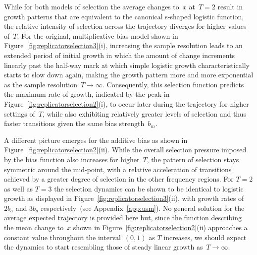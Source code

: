 While for both models of selection the average changes to~$x$ at~$T=2$ result in growth patterns that are equivalent to the canonical s-shaped logistic function, 
the relative intensity of selection across the trajectory diverges for higher values of~$T$. For the original, multiplicative bias model shown in Figure~\ref{fig:replicatorselection3}(i), increasing the sample resolution leads to an extended period of initial growth in which the amount of change increments linearly past the half-way mark at which simple logistic growth characteristically starts to slow down again, making the growth pattern more and more exponential as the sample resolution~$T\rightarrow\infty$.
Consequently, this selection function predicts the maximum rate of growth, indicated by the peak in Figure~\ref{fig:replicatorselection2}(i), to occur later during the trajectory for higher settings of~$T$, while also exhibiting relatively greater levels of selection and thus faster transitions given the same bias strength~$b_m$.

A different picture emerges for the additive bias as shown in Figure~\ref{fig:replicatorselection2}(ii). While the overall selection pressure imposed by the bias function also increases for higher~$T$, the pattern of selection stays symmetric around the mid-point, with a relative acceleration of transitions achieved by a greater degree of selection in the other frequency regions.
For $T=2$ as well as $T=3$ the selection dynamics can be shown to be identical to logistic growth as displayed in Figure~\ref{fig:replicatorselection3}(ii), with growth rates of $2b_a$ and $3b_a$ respectively~(see Appendix~\ref{app:usm}). No general solution for the average expected trajectory is provided here but, since the function describing the mean change to~$x$ shown in Figure~\ref{fig:replicatorselection2}(ii) approaches a constant value throughout the interval~$(0,1)$ as $T$ increases, we should expect the dynamics to start resembling those of steady linear growth as~$T\rightarrow\infty$.


